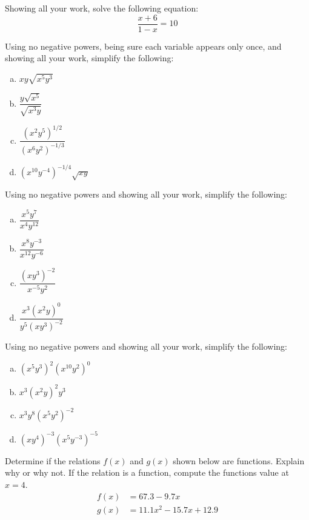 \documentclass[11pt,letterpaper]{article}
\begin{document}
\prob Showing all your work, solve the following equation:
	\[
	\dfrac{x + 6}{1 - x}= 10
	\] \pspace


\prob Using no negative powers, being sure each variable appears only once, and showing all your work, simplify the following:
        \begin{enumerate}[(a)]
        \item $xy\sqrt{x^5y^3}$
        \item $\dfrac{y \sqrt{x^5}}{\sqrt{x^3y}}$
        \item $\dfrac{(x^2 y^5)^{1/2}}{(x^6 y^{2})^{-1/3}}$
        \item $(x^{10} y^{-4})^{-1/4} \sqrt{xy}$
        \end{enumerate} \pspace


\prob Using no negative powers and showing all your work, simplify the following:
        \begin{enumerate}[(a)]
        \item $\dfrac{x^5 y^7}{x^4 y^{12}}$
        \item $\dfrac{x^8 y^{-3}}{x^{12} y^{-6}}$
        \item $\dfrac{(xy^3)^{-2}}{x^{-5} y^2}$
        \item $\dfrac{x^3 (x^2y)^0}{y^5(xy^3)^{-2}}$
        \end{enumerate} \pspace


\prob Using no negative powers and showing all your work, simplify the following:
	\begin{enumerate}[(a)]
	\item $(x^5 y^3)^2 (x^{10} y^2)^0$
	\item $x^3 (x^2y)^2 y^3$
	\item $x^3 y^8(x^5 y^2)^{-2}$
	\item $(xy^4)^{-3} (x^5 y^{-3})^{-5}$
	\end{enumerate} \pspace


\prob Determine if the relations $f(x)$ and $g(x)$ shown below are functions. Explain why or why not. If the relation is a function, compute the functions value at $x= 4$. 
	\[
	\begin{aligned}
	f(x)&= 67.3 - 9.7x \\[0.3cm]
	g(x)&= 11.1x^2 - 15.7x + 12.9
	\end{aligned}
	\] \pspace
\end{document}

